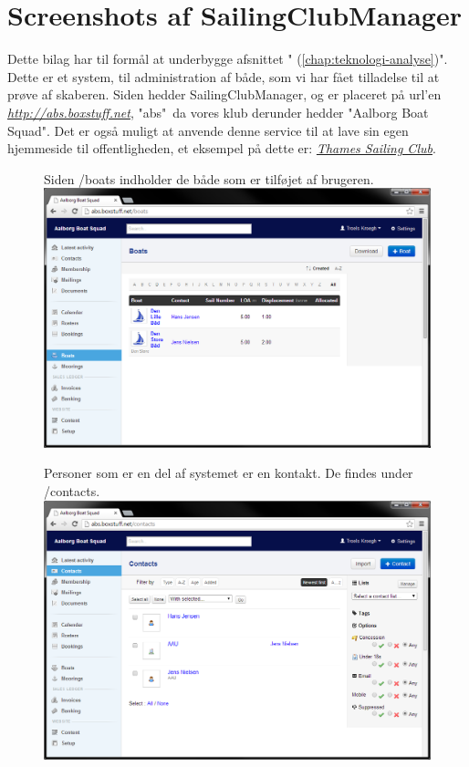 \chapter{Screenshots af SailingClubManager}

Dette bilag har til formål at underbygge afsnittet "  (\ref{chap:teknologi-analyse})". Dette er et system, til administration af både, som vi har fået tilladelse til at prøve af skaberen. Siden hedder SailingClubManager, og er placeret på url'en \href{http://abs.boxstuff.net}{\textit{http://abs.boxstuff.net}}, "abs"\ da vores klub derunder hedder "Aalborg Boat Squad". Det er også muligt at anvende denne service til at lave sin egen hjemmeside til offentligheden, et eksempel på dette er: \href{http://www.thamessailingclub.co.uk/}{\textit{Thames Sailing Club}}.

\begin{figure}
	Siden /boats indholder de både som er tilføjet af brugeren. \newline
	\includegraphics[scale=0.5]{images/teknologi/_Boats}
\end{figure}

\begin{figure}
	Personer som er en del af systemet er en kontakt. De findes under /contacts.\newline
	\includegraphics[scale=0.5]{images/teknologi/_Contacts}
\end{figure}

